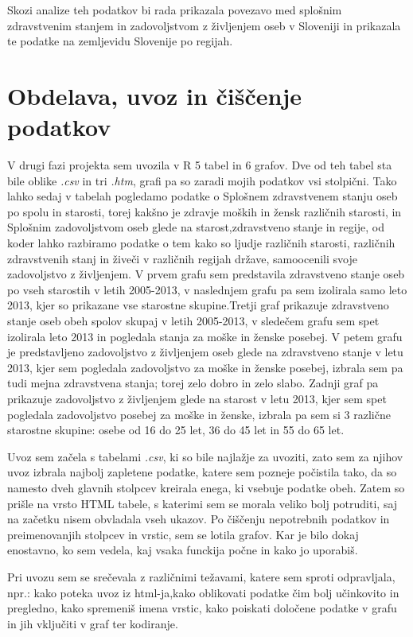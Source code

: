 \documentclass[11pt,a4paper]{article}
\begin{document}
Skozi analize teh podatkov bi rada prikazala povezavo med splošnim zdravstvenim stanjem in zadovoljstvom z življenjem oseb v Sloveniji in prikazala te podatke na zemljevidu Slovenije po regijah.
\newpage
\section{Obdelava, uvoz in čiščenje podatkov}
V drugi fazi projekta sem uvozila v R 5 tabel in 6 grafov. Dve od teh tabel sta bile oblike \textit{.csv} in tri \textit{.htm}, grafi pa so zaradi mojih podatkov vsi stolpični. Tako lahko sedaj v tabelah pogledamo podatke o Splošnem zdravstvenem stanju oseb po spolu in starosti, torej kakšno je zdravje moških in žensk različnih starosti, in Splošnim zadovoljstvom oseb glede na starost,zdravstveno stanje in regije, od koder lahko razbiramo podatke o tem kako so ljudje različnih starosti, različnih zdravstvenih stanj in živeči v različnih regijah države, samoocenili svoje zadovoljstvo z življenjem. V prvem grafu sem predstavila zdravstveno stanje oseb po vseh starostih v letih 2005-2013, v naslednjem grafu pa sem izolirala samo leto 2013, kjer so prikazane vse starostne skupine.Tretji graf prikazuje zdravstveno stanje oseb obeh spolov skupaj v letih 2005-2013, v sledečem grafu sem spet izolirala leto 2013 in pogledala stanja za moške in ženske posebej. V petem grafu je predstavljeno zadovoljstvo z življenjem oseb glede na zdravstveno stanje v letu 2013, kjer sem pogledala zadovoljstvo za moške in ženske posebej, izbrala sem pa tudi mejna zdravstvena stanja; torej zelo dobro in zelo slabo. Zadnji graf pa prikazuje zadovoljstvo z življenjem glede na starost v letu 2013, kjer sem spet pogledala zadovoljstvo posebej za moške in ženske, izbrala pa sem si 3 različne starostne skupine: osebe od 16 do 25 let, 36 do 45 let in 55 do 65 let.

Uvoz sem začela s tabelami \textit{.csv}, ki so bile najlažje za uvoziti, zato sem za njihov uvoz izbrala najbolj zapletene podatke, katere sem pozneje počistila tako, da so namesto dveh glavnih stolpcev kreirala enega, ki vsebuje podatke obeh. Zatem so prišle na vrsto HTML tabele, s katerimi sem se morala veliko bolj potruditi, saj na začetku nisem obvladala vseh ukazov. Po čiščenju nepotrebnih podatkov in preimenovanjih stolpcev in vrstic, sem se lotila grafov. Kar je bilo dokaj enostavno, ko sem vedela, kaj vsaka funckija počne in kako jo uporabiš.

 Pri uvozu sem se srečevala z različnimi težavami, katere sem sproti odpravljala, npr.: kako poteka uvoz iz html-ja,kako oblikovati podatke čim bolj učinkovito in pregledno, kako spremeniš imena vrstic, kako poiskati določene podatke v grafu in jih vključiti v graf ter kodiranje.
\end{document}
